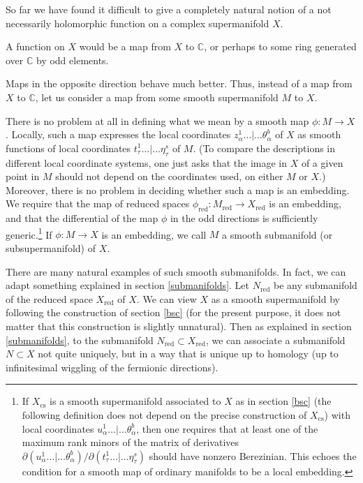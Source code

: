 \documentclass[11pt,a4paper]{article}
\def\cs{{\mathrm{cs}}}
\def\red{{\mathrm{red}}}
\def\C{{\mathbb C}}
\begin{document}
So far we have found it difficult to give a completely natural notion of a not necessarily holomorphic function on a complex supermanifold $X$.

A function on $X$ would be a map from $X$ to $\C$, or perhaps to some ring generated over $\C$ by odd elements. 

Maps in the opposite direction behave much better.  Thus, instead of a map from $X$ to $\C$, let us consider a map from some
smooth supermanifold $M$ to $X$. 

There is no problem at all in defining what we mean by a smooth map  $\phi:M\to X$.  Locally, such a map
 expresses the local coordinates $z^1_\alpha\dots|\dots\theta^b_\alpha$ of $X$ as smooth functions  of local coordinates $t^1_\tau\dots|\dots \eta^s_\tau$ of $M$.
 (To compare the descriptions in different local coordinate systems, one just asks that the image in $X$ of a given point in $M$ should not depend
 on the coordinates used, on either $M$ or $X$.)
 Moreover, there is no problem in deciding whether such a map is an embedding.
 We require that the map of reduced spaces $\phi_\red:M_\red\to X_\red$ is
 an embedding, and that the differential of the map $\phi$ in the odd directions is sufficiently generic.\footnote{If $X_\cs$
 is a smooth supermanifold associated to $X$ as in section \ref{bsc}  (the following definition does not depend on the precise
 construction of $X_\cs$) with local coordinates $u^1_\alpha\dots|\dots
 \theta^b_\alpha$, then one requires that at least one of the maximum rank minors of 
 the matrix of derivatives $\partial(u^1_\alpha\dots|\dots\theta^b_\alpha)/\partial(t^1_\tau\dots|\dots \eta^s_\tau)$ should
 have  nonzero Berezinian. This echoes the condition for a smooth map of ordinary manifolds to be a local embedding.}  If $\phi:M\to X$
 is an embedding, we call $M$ a smooth submanifold (or subsupermanifold) of $X$.
  
 There are many natural examples of such smooth submanifolds.  In fact, we 
 can adapt something  explained in  section \ref{submanifolds}.  Let $N_\red$ be any submanifold
 of the reduced space $X_\red$ of $X$.  We can view $X$ as a smooth supermanifold  by following the construction of section \ref{bsc} 
 (for the present purpose, it does not matter
 that this construction is slightly unnatural).   Then as explained in section \ref{submanifolds}, to the submanifold $N_\red\subset X_\red$,
 we can associate a submanifold $N\subset X$ not quite uniquely, but in a way that is unique up to homology (up to infinitesimal wiggling of the fermionic
 directions).   
 
\end{document}
